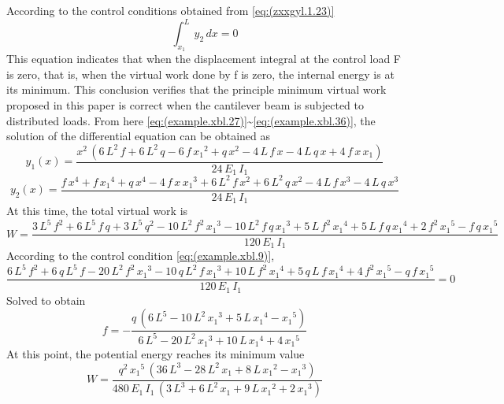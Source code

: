 According to the control conditions obtained from \ref{eq:(zxxgyl.1.23)}
\begin{equation}\label{eq:(example.xbl.37)}
\int_{x_1}^ {L}y_2 \,dx=0
\end{equation}
This equation indicates that when the displacement integral at the control load F is zero, that is, when the virtual work done by f is zero, the internal energy is at its minimum. This conclusion verifies that the principle minimum virtual work proposed in this paper is correct when the cantilever beam is subjected to distributed loads.
From here \ref{eq:(example.xbl.27)}\~{}\ref{eq:(example.xbl.36)}, the solution of the differential equation can be obtained as
\begin{equation}\label{eq:(example.xbl.10)}
y_1(x)=\frac{x^2 \,{\left(6\, L^2 \,f+6\,L^2 \,q-6\,f\, {x_1 }^2 +q\,x^2 -4\,L\,f\,x-4\,L\,q\,x+4\,f\,x\,x_1 \right)}}{24\,E_1 \,I_1 }
\end{equation}
\begin{equation}\label{eq:(example.xbl.11)}
y_2(x)=\frac{f\,x^4 +f\,{x_1 }^4 +q\,x^4 -4\,f\,x\,{x_1 }^3 +6\,L^2 \,f\,x^2 +6\,L^2 \,q\,x^2 -4\,L\,f\,x^3 -4\,L\,q\,x^3 }{24\,E_1 \,I_1 }
\end{equation}
At this time, the total virtual work is
\begin{equation}\label{eq:(example.xbl.12)}
W=\frac{3\, L^5 \,f^2 +6\,L^5 \,f\,q+3\,L^5 \,q^2 -10\,L^2 \,f^2 \, {x_1 }^3 -10\,L^2 \,f\,q\,{x_1 }^3 +5\,L\,f^2 \,{x_1 }^4 +5\,L\,f\,q\,{x_1 }^4 +2\,f^2 \,{x_1 }^5 -f\,q\,{x_1 }^5 }{120\,E_1 \,I_1 }
\end{equation}
According to the control condition \ref{eq:(example.xbl.9)},
\begin{equation}\label{eq:(example.xbl.13)}
\frac{6\, L^5 \,f^2 +6\,q\,L^5 \,f-20\,L^2 \,f^2 \, {x_1 }^3 -10\,q\,L^2 \,f\,{x_1 }^3 +10\,L\,f^2 \,{x_1 }^4 +5\,q\,L\,f\,{x_1 }^4 +4\,f^2 \,{x_1 }^5 -q\,f\,{x_1 }^5 }{120\,E_1 \,I_1 }=0
\end{equation}
Solved to obtain
\begin{equation}\label{eq:(example.xbl.13)}
f=-\frac{q\,{\left(6\,L^5 -10\,L^2 \,{x_1 }^3 +5\,L\,{x_1 }^4 -{x_1 }^5 \right)}}{6\,L^5 -20\,L^2 \,{x_1 }^3 +10\,L\,{x_1 }^4 +4\,{x_1 }^5 }
\end{equation}
At this point, the potential energy reaches its minimum value
\begin{equation}\label{eq:(example.xbl.14)}
W=\frac{q^2 \,{x_1 }^5 \,{\left(36\, L^3 -28\,L^2 \,x_1 +8\,L\, {x_1 }^2 -{x_1 }^3 \right)}}{480\,E_1 \,I_1 \,{\left(3\, L^3 +6\,L^2 \,x_1 +9\,L\, {x_1 }^2 +2\,{x_1 }^3 \right)}}
\end{equation}
